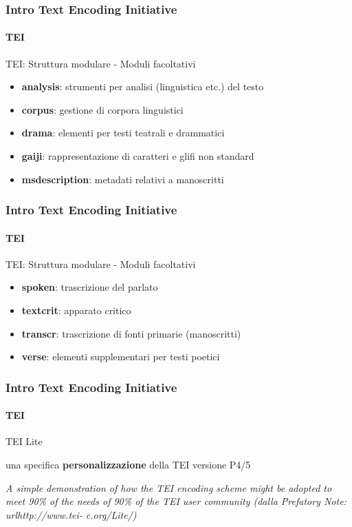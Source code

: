 \begin{frame}
	\frametitle{Intro Text Encoding Initiative}
	\framesubtitle{TEI}
	\addtocounter{nframe}{1}

	\begin{block}{TEI: Struttura modulare - Moduli facoltativi}
		\begin{itemize}
			\item \textbf{analysis}: strumenti per analisi (linguistica etc.) del testo
			\item \textbf{corpus}: gestione di corpora linguistici
			\item \textbf{drama}: elementi per testi teatrali e drammatici
			\item \textbf{gaiji}: rappresentazione di caratteri e glifi non standard
			\item \textbf{msdescription}: metadati relativi a manoscritti
		\end{itemize}

	\end{block}

\end{frame}


\begin{frame}
	\frametitle{Intro Text Encoding Initiative}
	\framesubtitle{TEI}
	\addtocounter{nframe}{1}

	\begin{block}{TEI: Struttura modulare - Moduli facoltativi}
		\begin{itemize}
			\item \textbf{spoken}: trascrizione del parlato
			\item \textbf{textcrit}: apparato critico
			\item \textbf{transcr}:  trascrizione di fonti primarie (manoscritti)
			\item \textbf{verse}: elementi supplementari per testi poetici
		\end{itemize}

	\end{block}

\end{frame}

\begin{frame}
	\frametitle{Intro Text Encoding Initiative}
	\framesubtitle{TEI}
	\addtocounter{nframe}{1}

	\begin{block}{TEI Lite}

		una specifica \textbf{personalizzazione} della TEI versione P4/5

	\end{block}

	\textit{A simple demonstration of how the TEI encoding scheme
		might be adopted to meet 90\% of the needs of 90\% of the
		TEI user community (dalla Prefatory Note: \\url{http://www.tei-
		c.org/Lite/})}

\end{frame}


